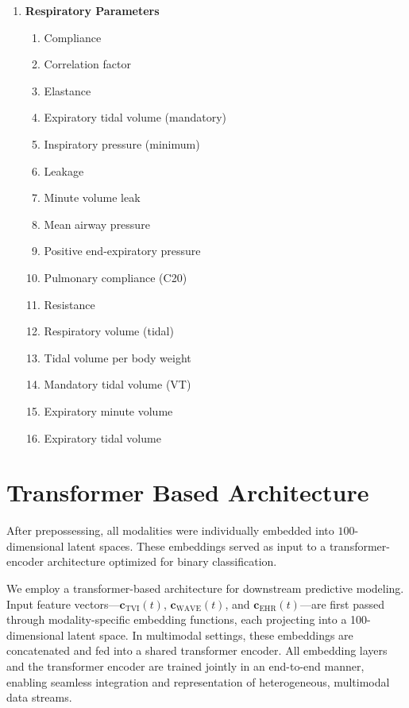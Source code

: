 \begin{enumerate}
    \item \textbf{Respiratory Parameters}
          \begin{enumerate}
              \item Compliance
              \item Correlation factor
              \item Elastance
              \item Expiratory tidal volume (mandatory)
              \item Inspiratory pressure (minimum)
              \item Leakage
              \item Minute volume leak
              \item Mean airway pressure
              \item Positive end-expiratory pressure
              \item Pulmonary compliance (C20)
              \item Resistance
              \item Respiratory volume (tidal)
              \item Tidal volume per body weight
              \item Mandatory tidal volume (VT)
              \item Expiratory minute volume
              \item Expiratory tidal volume
          \end{enumerate}
\end{enumerate}

\section{Transformer Based Architecture}


After prepossessing, all modalities were individually embedded into $100$-dimensional latent spaces. These embeddings served as input to a transformer-encoder architecture optimized for binary classification.

We employ a transformer-based architecture for downstream predictive modeling. Input feature vectors—\(\mathbf{c}_{\text{TVI}}(t)\), \(\mathbf{c}_{\text{WAVE}}(t)\), and \(\mathbf{c}_{\text{EHR}}(t)\)—are first passed through modality-specific embedding functions, each projecting into a 100-dimensional latent space. In multimodal settings, these embeddings are concatenated and fed into a shared transformer encoder. All embedding layers and the transformer encoder are trained jointly in an end-to-end manner, enabling seamless integration and representation of heterogeneous, multimodal data streams.


